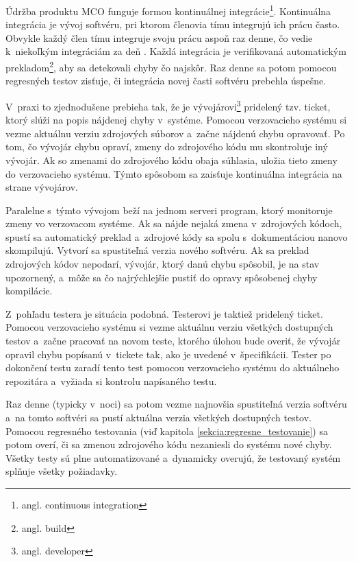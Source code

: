 Údržba produktu MCO funguje formou kontinuálnej 
integrácie\footnote{angl. continuous integration}.
Kontinuálna integrácia je vývoj softvéru, pri ktorom členovia tímu integrujú
ich prácu často. Obvykle každý člen tímu integruje svoju prácu aspoň 
raz denne, čo vedie k~niekoľkým integráciám za deň 
\cite{Continuous_integration}.
Každá integrácia je verifikovaná automatickým 
prekladom\footnote{angl. build}, aby sa detekovali chyby čo najskôr. 
Raz denne sa potom pomocou regresných testov zisťuje,
či integrácia novej časti softvéru prebehla úspešne.

V~praxi to zjednodušene prebieha tak, že je vývojárovi\footnote{angl. developer}
pridelený tzv. ticket, ktorý slúži na popis nájdenej chyby v~systéme. 
Pomocou verzovacieho systému si vezme aktuálnu verziu zdrojových súborov 
a~začne nájdenú chybu opravovať.
Po tom, čo vývojár chybu opraví, zmeny do zdrojového kódu mu skontroluje 
iný vývojár. Ak so zmenami do zdrojového kódu obaja súhlasia, uložia 
tieto zmeny do verzovacieho systému. Týmto spôsobom sa zaisťuje 
kontinuálna integrácia na strane vývojárov.

Paralelne s~týmto vývojom beží na jednom serveri program, ktorý 
monitoruje zmeny vo verzovacom systéme. Ak sa nájde nejaká zmena 
v~zdrojových kódoch, spustí sa automatický preklad a~zdrojové kódy sa 
spolu s~dokumentáciou nanovo skompilujú. Vytvorí sa spustiteľná verzia 
nového softvéru. Ak sa preklad zdrojových kódov nepodarí, vývojár, ktorý 
danú chybu spôsobil, je na stav upozornený, a~môže sa čo najrýchlejšie 
pustiť do opravy spôsobenej chyby kompilácie.

Z~pohľadu testera je situácia podobná. Testerovi je taktiež pridelený 
ticket. Pomocou verzovacieho systému si vezme aktuálnu verziu
všetkých dostupných testov a~začne pracovať na novom teste, ktorého úlohou bude 
overiť, že vývojár opravil chybu popísanú v~tickete tak, ako je 
uvedené v~špecifikácii.
Tester po dokončení testu zaradí tento test pomocou verzovacieho 
systému do aktuálneho repozitára a~vyžiada si kontrolu napísaného testu. 

Raz denne (typicky v~noci) sa potom vezme najnovšia spustiteľná verzia 
softvéru a~na tomto softvéri sa pustí aktuálna verzia všetkých dostupných 
testov. Pomocou regresného testovania 
(viď kapitola \ref{sekcia:regresne_testovanie}) sa potom overí, či sa 
zmenou zdrojového kódu nezaniesli do systému nové chyby. 
Všetky testy sú plne automatizované a~dynamicky overujú, že testovaný 
systém splňuje všetky požiadavky.

